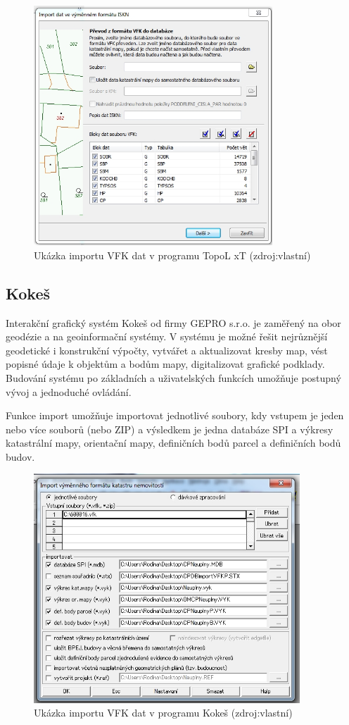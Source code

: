 \begin{figure}[H]
	 \centering
      \includegraphics[height=9cm]{./pictures/topol.png}
      \caption{Ukázka importu VFK dat v programu TopoL xT (zdroj:vlastní)}
      \label{fig:topol}
  \end{figure}
\subsection{Kokeš}
Interakční grafický systém Kokeš od firmy GEPRO s.r.o. je zaměřený na
obor geodézie a na geoinformační systémy. V systému je možné řešit
nejrůznější geodetické i konstrukční výpočty, vytvářet a aktualizovat
kresby map, vést popisné údaje k objektům a bodům mapy, digitalizovat
grafické podklady. Budování systému po základních a uživatelských
funkcích umožňuje postupný vývoj a jednoduché
ovládání. \cite{kokes_cvut}

Funkce import  umožňuje importovat jednotlivé soubory, kdy vstupem je jeden nebo více souborů  (nebo ZIP) a výsledkem je jedna databáze SPI a výkresy katastrální mapy, orientační mapy, definičních bodů parcel a definičních bodů budov. %

\begin{figure}[H]
	 \centering
      \includegraphics[width=10cm]{./pictures/kokes.png}
      \caption{Ukázka importu VFK dat v programu Kokeš (zdroj:vlastní)}
      \label{fig:kokes}
  \end{figure}
  
